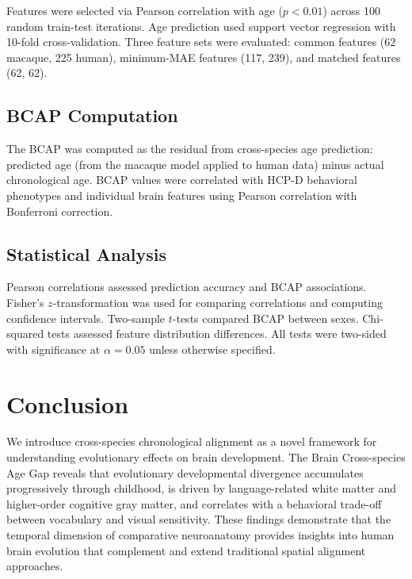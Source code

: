 \documentclass[11pt]{article}
\begin{document}
Features were selected via Pearson correlation with age ($p < 0.01$) across 100 random train-test iterations. Age prediction used support vector regression with 10-fold cross-validation. Three feature sets were evaluated: common features (62 macaque, 225 human), minimum-MAE features (117, 239), and matched features (62, 62).

\subsection{BCAP Computation}

The BCAP was computed as the residual from cross-species age prediction: predicted age (from the macaque model applied to human data) minus actual chronological age. BCAP values were correlated with HCP-D behavioral phenotypes and individual brain features using Pearson correlation with Bonferroni correction.

\subsection{Statistical Analysis}

Pearson correlations assessed prediction accuracy and BCAP associations. Fisher's $z$-transformation was used for comparing correlations and computing confidence intervals. Two-sample $t$-tests compared BCAP between sexes. Chi-squared tests assessed feature distribution differences. All tests were two-sided with significance at $\alpha = 0.05$ unless otherwise specified.

\section{Conclusion}

We introduce cross-species chronological alignment as a novel framework for understanding evolutionary effects on brain development. The Brain Cross-species Age Gap reveals that evolutionary developmental divergence accumulates progressively through childhood, is driven by language-related white matter and higher-order cognitive gray matter, and correlates with a behavioral trade-off between vocabulary and visual sensitivity. These findings demonstrate that the temporal dimension of comparative neuroanatomy provides insights into human brain evolution that complement and extend traditional spatial alignment approaches.



\end{document}
